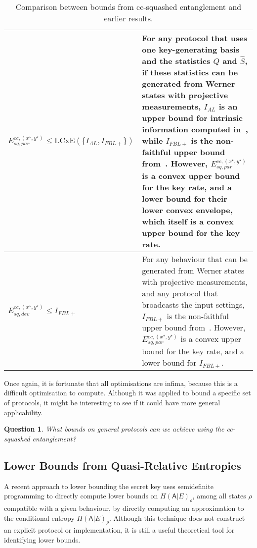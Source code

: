 \documentclass[10pt, a4paper]{article}
\numberwithin{equation}{section} %
\theoremstyle{definition}
\theoremstyle{plain}
\newtheorem{question}{Question}
\newenvironment{Tabular}[1] %
{\def\arraystretch{1.75}\begin{tabular}{#1}}
{\end{tabular}}
\newcommand{\tableline}[1]{\dimexpr #1\linewidth-2\tabcolsep}
\newcommand{\?}{\mathrel{?}} %
\newcommand{\crv}[1]{\mathsf{#1}}
\newcommand{\LCxE}[1]{\mathrm{LCxE}\left(#1\right)}
\begin{document}
    \begin{table}
      \begin{Tabular}{| >{\centering}m{\tableline{0.3}}|m{\tableline{0.7}}|}
        \hline
        \( E^{cc,(x^{\star},y^{\star})}_{sq,par} \leq \LCxE{\{I_{AL}, I_{FBL+}\}} \) & For any protocol that uses one key-generating basis and the statistics \(Q\) and \(\hat{S}\), if these statistics can be generated from Werner states with projective measurements, \(I_{AL}\) is an upper bound for intrinsic information computed in~\cite{RevisedPeres}, while \(I_{FBL+}\) is the non-faithful upper bound from~\cite{NotSufficient}. However, \(E^{cc,(x^{\star},y^{\star})}_{sq,par}\) is a convex upper bound for the key rate, and a lower bound for their lower convex envelope, which itself is a convex upper bound for the key rate. \\ \hline
        \( E^{cc,(x^{\star},y^{\star})}_{sq,dev} \leq I_{FBL+} \) & For any behaviour that can be generated from Werner states with projective measurements, and any protocol that broadcasts the input settings, \(I_{FBL+}\) is the non-faithful upper bound from~\cite{NotSufficient}. However, \(E^{cc,(x^{\star},y^{\star})}_{sq,par}\) is a convex upper bound for the key rate, and a lower bound for \(I_{FBL+}\). \\ \hline
      \end{Tabular}
      \caption{\label{tab:ccsqcomp} Comparison between bounds from cc-squashed entanglement and earlier results.}
    \end{table}

    Once again, it is fortunate that all optimisations are infima, because this is a difficult optimisation to compute. Although it was applied to bound a specific set of protocols, it might be interesting to see if it could have more general applicability.

    \begin{question}
      What bounds on general protocols can we achieve using the cc-squashed entanglement?
    \end{question}

    \subsection{Lower Bounds from Quasi-Relative Entropies}\label{sec:diqkd_qre}

    A recent approach to lower bounding the secret key uses semidefinite programming to directly compute lower bounds on \(H{(\crv{A}|E)}_{\rho}\), among all states \(\rho\) compatible with a given behaviour, by directly computing an approximation to the conditional entropy \(H{(\crv{A}|E)}_{\rho}\). Although this technique does not construct an explicit protocol or implementation, it is still a useful theoretical tool for identifying lower bounds.
\end{document}
